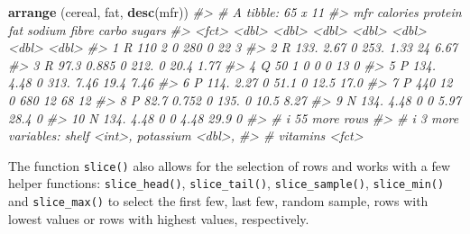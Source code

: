 \documentclass[
]{book}
\newenvironment{Shaded}{\begin{snugshade}}{\end{snugshade}}
\newcommand{\CommentTok}[1]{\textcolor[rgb]{0.56,0.35,0.01}{\textit{#1}}}
\newcommand{\FunctionTok}[1]{\textcolor[rgb]{0.13,0.29,0.53}{\textbf{#1}}}
\newcommand{\NormalTok}[1]{#1}
\begin{document}
\begin{Shaded}
\begin{Highlighting}[]
\FunctionTok{arrange}\NormalTok{ (cereal, fat, }\FunctionTok{desc}\NormalTok{(mfr))}
\CommentTok{\#\textgreater{} \# A tibble: 65 x 11}
\CommentTok{\#\textgreater{}    mfr   calories protein   fat sodium fibre carbo sugars}
\CommentTok{\#\textgreater{}    \textless{}fct\textgreater{}    \textless{}dbl\textgreater{}   \textless{}dbl\textgreater{} \textless{}dbl\textgreater{}  \textless{}dbl\textgreater{} \textless{}dbl\textgreater{} \textless{}dbl\textgreater{}  \textless{}dbl\textgreater{}}
\CommentTok{\#\textgreater{}  1 R        110     2         0  280    0     22     3   }
\CommentTok{\#\textgreater{}  2 R        133.    2.67      0  253.   1.33  24     6.67}
\CommentTok{\#\textgreater{}  3 R         97.3   0.885     0  212.   0     20.4   1.77}
\CommentTok{\#\textgreater{}  4 Q         50     1         0    0    0     13     0   }
\CommentTok{\#\textgreater{}  5 P        134.    4.48      0  313.   7.46  19.4   7.46}
\CommentTok{\#\textgreater{}  6 P        114.    2.27      0   51.1  0     12.5  17.0 }
\CommentTok{\#\textgreater{}  7 P        440    12         0  680   12     68    12   }
\CommentTok{\#\textgreater{}  8 P         82.7   0.752     0  135.   0     10.5   8.27}
\CommentTok{\#\textgreater{}  9 N        134.    4.48      0    0    5.97  28.4   0   }
\CommentTok{\#\textgreater{} 10 N        134.    4.48      0    0    4.48  29.9   0   }
\CommentTok{\#\textgreater{} \# i 55 more rows}
\CommentTok{\#\textgreater{} \# i 3 more variables: shelf \textless{}int\textgreater{}, potassium \textless{}dbl\textgreater{},}
\CommentTok{\#\textgreater{} \#   vitamins \textless{}fct\textgreater{}}
\end{Highlighting}
\end{Shaded}

The function \texttt{slice()} also allows for the selection of rows and works with a few helper functions: \texttt{slice\_head()}, \texttt{slice\_tail()}, \texttt{slice\_sample()}, \texttt{slice\_min()} and \texttt{slice\_max()} to select the first few, last few, random sample, rows with lowest values or rows with highest values, respectively.
\end{document}
